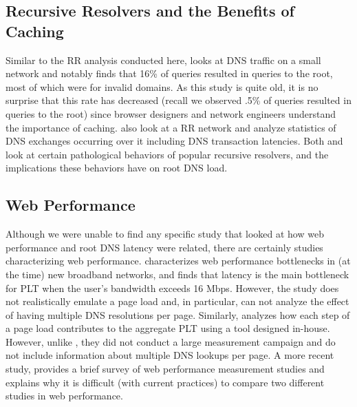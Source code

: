 \documentclass[sigconf,nonacm,10pt]{acmart}
\begin{document}
\subsection{Recursive Resolvers and the Benefits of
Caching}\label{recursive-resolvers-and-the-benefits-of-caching}

Similar to the RR analysis conducted here, \cite{jung2002dns} looks at
DNS traffic on a small network and notably finds that 16\% of queries
resulted in queries to the root, most of which were for invalid domains.
As this study is quite old, it is no surprise that this rate has
decreased (recall we observed .5\% of queries resulted in queries to the
root) since browser designers and network engineers understand the
importance of caching. \cite{callahan2013modern} also look at a RR
network and analyze statistics of DNS exchanges occurring over it
including DNS transaction latencies. Both \cite{lentz2013d} and
\cite{yu2012authority} look at certain pathological behaviors of popular
recursive resolvers, and the implications these behaviors have on root
DNS load.

\subsection{Web Performance}\label{web-performance}

Although we were unable to find any specific study that looked at how
web performance and root DNS latency were related, there are certainly
studies characterizing web performance. \cite{sundaresan2013web}
characterizes web performance bottlenecks in (at the time) new broadband
networks, and finds that latency is the main bottleneck for PLT when the
user's bandwidth exceeds 16 Mbps. However, the study does not
realistically emulate a page load and, in particular, can not analyze
the effect of having multiple DNS resolutions per page. Similarly,
\cite{asrese2016wepr} analyzes how each step of a page load contributes
to the aggregate PLT using a tool designed in-house. However, unlike
\cite{sundaresan2013web}, they did not conduct a large measurement
campaign and do not include information about multiple DNS lookups per
page. A more recent study, \cite{enghardt2019web} provides a brief
survey of web performance measurement studies and explains why it is
difficult (with current practices) to compare two different studies in
web performance.

\iffalse
\end{document}
